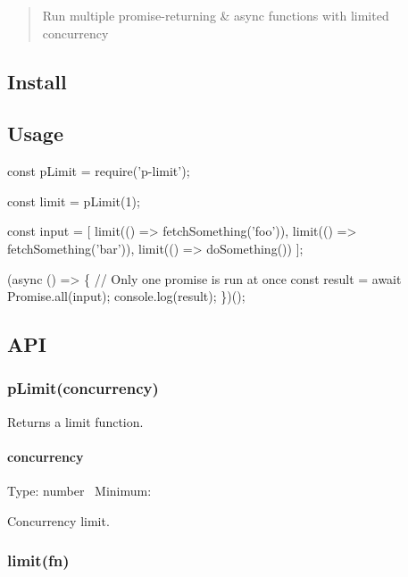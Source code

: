 \begin{quote}
Run multiple promise-\/returning \& async functions with limited concurrency \end{quote}


\subsection*{Install}




\subsection*{Usage}


\begin{DoxyCode}
const pLimit = require('p-limit');

const limit = pLimit(1);

const input = [
    limit(() => fetchSomething('foo')),
    limit(() => fetchSomething('bar')),
    limit(() => doSomething())
];

(async () => \{
    // Only one promise is run at once
    const result = await Promise.all(input);
    console.log(result);
\})();
\end{DoxyCode}


\subsection*{A\+PI}

\subsubsection*{p\+Limit(concurrency)}

Returns a {\ttfamily limit} function.

\paragraph*{concurrency}

Type\+: {\ttfamily number}~\newline
 Minimum\+: {}

Concurrency limit.

\subsubsection*{limit(fn)}

